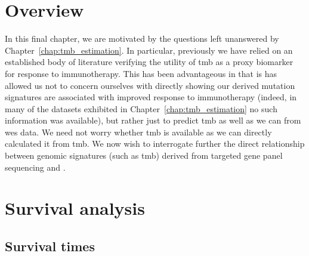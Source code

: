 \documentclass[../thesis.tex]{subfiles}
\begin{document}
\section{Overview}
In this final chapter, we are motivated by the questions left unanswered by Chapter~\ref{chap:tmb_estimation}. In particular, previously we have relied on an established body of literature verifying the utility of \gls{tmb} as a proxy biomarker for response to immunotherapy. This has been advantageous in that is has allowed us not to concern ourselves with directly showing our derived mutation signatures are associated with improved response to immunotherapy (indeed, in many of the datasets exhibited in Chapter~\ref{chap:tmb_estimation} no such information was available), but rather just to predict \gls{tmb} as well as we can from \gls{wes} data. We need not worry whether \gls{tmb} is available as we can directly calculated it from \gls{tmb}. We now wish to interrogate further the direct relationship between genomic signatures (such as \gls{tmb}) derived from targeted gene panel sequencing and .


\section{Survival analysis \label{sec:survival}}


\subsection{Survival times}
\end{document}
